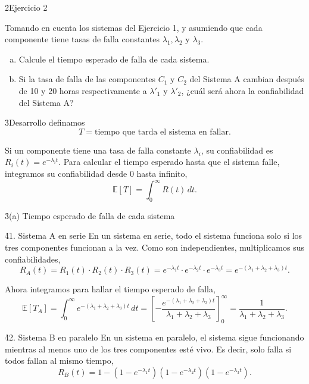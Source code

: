 \documentclass[practices.tex]{subfiles}%
\begin{document}
\h2{Ejercicio 2}

Tomando en cuenta los sistemas del Ejercicio 1, y asumiendo que cada componente tiene tasas de falla constantes $\lambda_1, \lambda_2$ y $\lambda_3$.
\begin{enumerate}[(a)]
    \item Calcule el tiempo esperado de falla de cada sistema.
    \item Si la tasa de falla de las componentes $C_1$ y $C_2$ del Sistema A cambian después de 10 y 20 horas respectivamente a $\lambda'_1$ y $\lambda'_2$, ¿cuál será ahora la confiabilidad del Sistema A?
\end{enumerate}

\vspace{3mm}
\h3{Desarrollo}
definamos
 $$T = \text{tiempo que tarda el sistema en fallar.}$$ 

Si un componente tiene una tasa de falla constante $\lambda_i$, su confiabilidad es $R_i(t) = e^{-\lambda_i t}$. Para calcular el tiempo esperado hasta que el sistema falle, integramos su confiabilidad desde $0$ hasta infinito,
\begin{equation*}
    \mathbb{E}[T] = \int_0^\infty R(t)\,dt.
\end{equation*}

\vspace{3mm}
\h3{(a) Tiempo esperado de falla de cada sistema}

\h4{1. Sistema A en serie}
En un sistema en serie, todo el sistema funciona solo si los tres componentes funcionan a la vez. Como son independientes, multiplicamos sus confiabilidades,
\begin{equation*}
    R_A(t) = R_1(t) \cdot R_2(t) \cdot R_3(t) = e^{-\lambda_1 t} \cdot e^{-\lambda_2 t} \cdot e^{-\lambda_3 t} = e^{-(\lambda_1 + \lambda_2 + \lambda_3)t}.
\end{equation*}

Ahora integramos para hallar el tiempo esperado de falla,
\begin{equation*}
    \mathbb{E}[T_A] = \int_0^\infty e^{-(\lambda_1 + \lambda_2 + \lambda_3)t}\,dt = \left[ -\frac{e^{-(\lambda_1 + \lambda_2 + \lambda_3)t}}{\lambda_1 + \lambda_2 + \lambda_3} \right]_0^\infty = \frac{1}{\lambda_1 + \lambda_2 + \lambda_3}.
\end{equation*}

\vspace{3mm}
\h4{2. Sistema B en paralelo}
En un sistema en paralelo, el sistema sigue funcionando mientras al menos uno de los tres componentes esté vivo. Es decir, solo falla si todos fallan al mismo tiempo,
\begin{equation*}
    R_B(t) = 1 - (1 - e^{-\lambda_1 t})(1 - e^{-\lambda_2 t})(1 - e^{-\lambda_3 t}).
\end{equation*}
\end{document}
